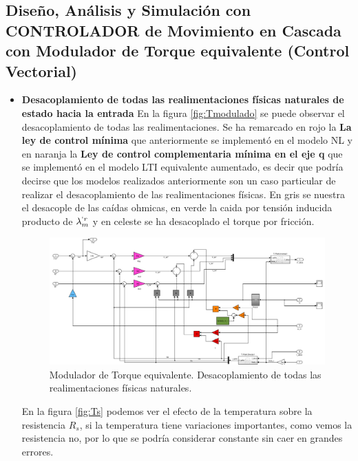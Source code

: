 \documentclass[10pt]{article}
\begin{document}
\subsection{Diseño, Análisis y Simulación con CONTROLADOR de Movimiento en Cascada con Modulador de Torque equivalente (Control Vectorial)}
\begin{itemize}
\item \textbf{Desacoplamiento de todas las realimentaciones físicas naturales de estado hacia la entrada}
	 En la figura \ref{fig:Tmodulado} se puede observar el desacoplamiento de todas las realimentaciones. Se ha remarcado en rojo la \textbf{La ley de control mínima} que anteriormente se implementó en el modelo NL y en naranja la \textbf{Ley de control complementaria mínima en el eje q}  que se implementó en el modelo LTI equivalente aumentado, es decir que podría decirse que los modelos realizados anteriormente son un caso particular de realizar el desacoplamiento de las realimentaciones físicas. En gris se nuestra el desacople de las caídas ohmicas, en verde la caida por tensión inducida producto de $\lambda^{`r}_{m}$ y en celeste se ha desacoplado el torque por fricción.

	\begin{figure}[h!]
	\centering
	\includegraphics[width=\textwidth]{modulador de torque.png}
	\caption{\label{fig:Tmodulador}Modulador de Torque equivalente. Desacoplamiento de todas las realimentaciones físicas naturales.}
	\end{figure}
	
	En la figura \ref{fig:Ts} podemos ver el efecto de la temperatura sobre la resistencia $R_{s}$, si la temperatura tiene variaciones importantes, como vemos la resistencia no, por lo que se podría considerar constante sin caer en grandes errores. 
	

\end{itemize}
\end{document}
